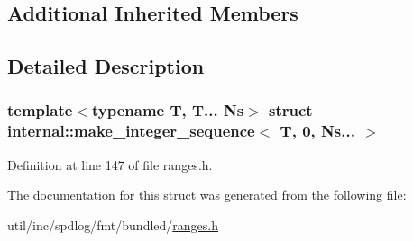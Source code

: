 \subsection*{Additional Inherited Members}


\subsection{Detailed Description}
\subsubsection*{template$<$typename T, T... Ns$>$\newline
struct internal\+::make\+\_\+integer\+\_\+sequence$<$ T, 0, Ns... $>$}



Definition at line 147 of file ranges.\+h.



The documentation for this struct was generated from the following file\+:\begin{DoxyCompactItemize}
\item 
util/inc/spdlog/fmt/bundled/\hyperlink{ranges_8h}{ranges.\+h}\end{DoxyCompactItemize}
